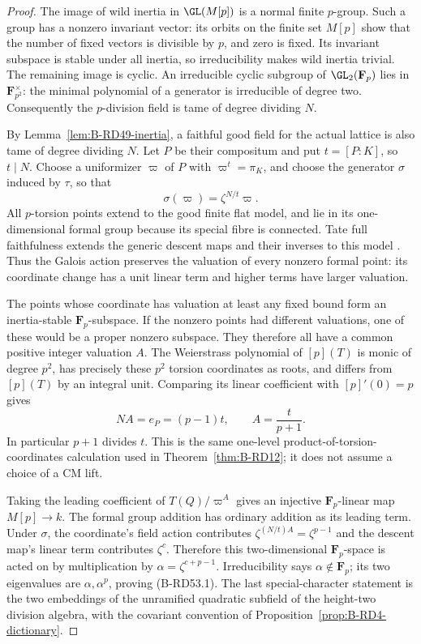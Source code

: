 \begin{proof}
The image of wild inertia in $\GL(M[p])$ is a normal finite
$p$-group. Such a group has a nonzero invariant vector: its
orbits on the finite set $M[p]$ show that the number of fixed
vectors is divisible by $p$, and zero is fixed. Its invariant
subspace is stable under all inertia, so irreducibility makes
wild inertia trivial. The remaining image is cyclic. An
irreducible cyclic subgroup of $\GL_2(\mathbf F_p)$ lies in
$\mathbf F_{p^2}^{\times}$: the minimal polynomial of a
generator is irreducible of degree two. Consequently the
$p$-division field is tame of degree dividing $N$.

By Lemma~\ref{lem:B-RD49-inertia}, a faithful good field for
the actual lattice is also tame of degree dividing $N$.
Let $P$ be their compositum and put $t=[P:K]$, so $t\mid N$.
Choose a uniformizer $\varpi$ of $P$ with
$\varpi^t=\pi_K$, and choose the generator $\sigma$ induced
by $\tau$, so that
\[
                  \sigma(\varpi)=\zeta^{N/t}\varpi.
\]
All $p$-torsion points extend to the good finite flat model,
and lie in its one-dimensional formal group because its
special fibre is connected. Tate full faithfulness extends
the generic descent maps and their inverses to this model
\cite[Theorem~4 and Corollaries~1--2, p.~181]
{Tate1967PDivisible}. Thus the Galois action preserves the
valuation of every nonzero formal point: its coordinate
change has a unit linear term and higher terms have larger
valuation.

The points whose coordinate has valuation at least any
fixed bound form an inertia-stable $\mathbf F_p$-subspace.
If the nonzero points had different valuations, one of
these would be a proper nonzero subspace. They therefore
all have a common positive integer valuation $A$.
The Weierstrass polynomial of $[p](T)$ is monic of degree
$p^2$, has precisely these $p^2$ torsion coordinates as
roots, and differs from $[p](T)$ by an integral unit.
Comparing its linear coefficient with $[p]'(0)=p$ gives
\[
                         NA=e_P=(p-1)t,
 \qquad A=\frac{t}{p+1}.                              \tag{B-RD53.2}
\]
In particular $p+1$ divides $t$.
This is the same one-level product-of-torsion-coordinates
calculation used in Theorem~\ref{thm:B-RD12}; it does not
assume a choice of a CM lift.

Taking the leading coefficient of $T(Q)/\varpi^A$ gives
an injective $\mathbf F_p$-linear map $M[p]\to k$.
The formal group addition has ordinary addition as its
leading term. Under $\sigma$, the coordinate's field action
contributes $\zeta^{(N/t)A}=\zeta^{p-1}$ and the descent
map's linear term contributes $\zeta^c$. Therefore this
two-dimensional $\mathbf F_p$-space is acted on by
multiplication by $\alpha=\zeta^{c+p-1}$.
Irreducibility says $\alpha\notin\mathbf F_p$; its two
eigenvalues are $\alpha,\alpha^p$, proving (B-RD53.1).
The last special-character statement is the two embeddings
of the unramified quadratic subfield of the height-two
division algebra, with the covariant convention of
Proposition~\ref{prop:B-RD4-dictionary}.
\end{proof}

